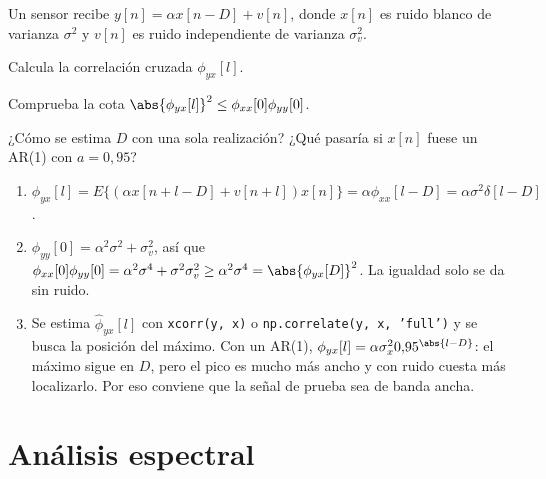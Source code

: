 \documentclass[11pt,a4paper]{scrartcl}
\begin{document}
\begin{ejercicio}
  Un sensor recibe $y[n]=\alpha x[n-D]+v[n]$, donde $x[n]$ es ruido blanco de varianza $\sigma^2$ y $v[n]$ es ruido independiente de varianza $\sigma_v^2$.
  \begin{incisos}[1]
    \item Calcula la correlación cruzada $\phi_{yx}[l]$.
    \item Comprueba la cota $\abs{\phi_{yx}[l]}^2\le\phi_{xx}[0]\phi_{yy}[0]$.
    \item ¿Cómo se estima $D$ con una sola realización? ¿Qué pasaría si $x[n]$ fuese un AR(1) con $a=0{,}95$?
  \end{incisos}
\end{ejercicio}
\begin{solucion}
  \begin{enumerate}[label=\alph*)]
    \item $\phi_{yx}[l]=E\{(\alpha x[n+l-D]+v[n+l])x[n]\}=\alpha\phi_{xx}[l-D]=\alpha\sigma^2\delta[l-D]$.
    \item $\phi_{yy}[0]=\alpha^2\sigma^2+\sigma_v^2$, así que $\phi_{xx}[0]\phi_{yy}[0]=\alpha^2\sigma^4+\sigma^2\sigma_v^2\ge\alpha^2\sigma^4=\abs{\phi_{yx}[D]}^2$. La igualdad solo se da sin ruido.
    \item Se estima $\hat\phi_{yx}[l]$ con \texttt{xcorr(y, x)} o \texttt{np.correlate(y, x, 'full')} y se busca la posición del máximo. Con un AR(1), $\phi_{yx}[l]=\alpha\sigma_x^20{,}95^{\abs{l-D}}$: el máximo sigue en $D$, pero el pico es mucho más ancho y con ruido cuesta más localizarlo. Por eso conviene que la señal de prueba sea de banda ancha.
  \end{enumerate}
\end{solucion}

\section*{Análisis espectral}
\end{document}
